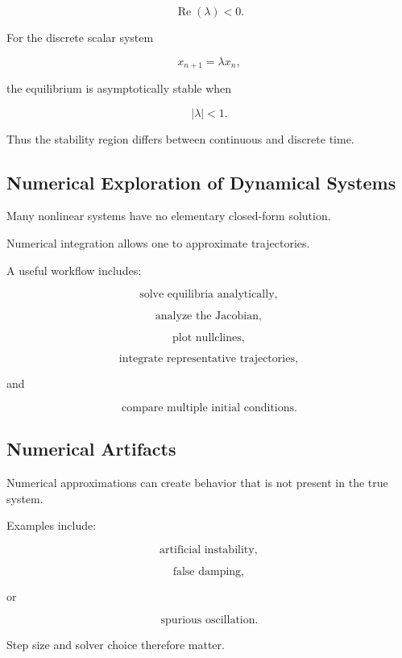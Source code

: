 \[
\boxed{
\operatorname{Re}(\lambda)<0.
}
\]

For the discrete scalar system

\[
x_{n+1}
=
\lambda x_n,
\]

the equilibrium is asymptotically stable when

\[
\boxed{
|\lambda|<1.
}
\]

Thus the stability region differs between continuous and discrete time.

\subsection{Numerical Exploration of Dynamical Systems}
\label{subsec:numerical-dynamical-systems}

Many nonlinear systems have no elementary closed-form solution.

Numerical integration allows one to approximate trajectories.

A useful workflow includes:

\[
\boxed{
\text{solve equilibria analytically},
}
\]

\[
\boxed{
\text{analyze the Jacobian},
}
\]

\[
\boxed{
\text{plot nullclines},
}
\]

\[
\boxed{
\text{integrate representative trajectories},
}
\]

and

\[
\boxed{
\text{compare multiple initial conditions}.
}
\]

\subsection{Numerical Artifacts}
\label{subsec:dynamical-numerical-artifacts}

Numerical approximations can create behavior that is not present in the
true system.

Examples include:

\[
\boxed{
\text{artificial instability},
}
\]

\[
\boxed{
\text{false damping},
}
\]

or

\[
\boxed{
\text{spurious oscillation}.
}
\]

Step size and solver choice therefore matter.


